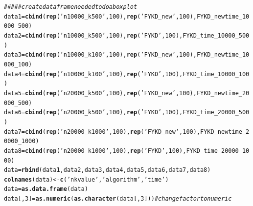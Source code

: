 \documentclass{article}\usepackage[]{graphicx}\usepackage[]{color}
\makeatletter
\newcommand{\hlnum}[1]{\textcolor[rgb]{0.686,0.059,0.569}{#1}}%
\newcommand{\hlstr}[1]{\textcolor[rgb]{0.192,0.494,0.8}{#1}}%
\newcommand{\hlcom}[1]{\textcolor[rgb]{0.678,0.584,0.686}{\textit{#1}}}%
\newcommand{\hlstd}[1]{\textcolor[rgb]{0.345,0.345,0.345}{#1}}%
\newcommand{\hlkwb}[1]{\textcolor[rgb]{0.69,0.353,0.396}{#1}}%
\newcommand{\hlkwd}[1]{\textcolor[rgb]{0.737,0.353,0.396}{\textbf{#1}}}%
\newenvironment{kframe}{%
 \def\at@end@of@kframe{}%
 \ifinner\ifhmode%
  \def\at@end@of@kframe{\end{minipage}}%
  \begin{minipage}{\columnwidth}%
 \fi\fi%
 \def\FrameCommand##1{\hskip\@totalleftmargin \hskip-\fboxsep
 \colorbox{shadecolor}{##1}\hskip-\fboxsep
     \hskip-\linewidth \hskip-\@totalleftmargin \hskip\columnwidth}%
 \MakeFramed {\advance\hsize-\width
   \@totalleftmargin\z@ \linewidth\hsize
   \@setminipage}}%
 {\par\unskip\endMakeFramed%
 \at@end@of@kframe}
\newenvironment{knitrout}{}{} %
\makeatother
\begin{document}
\begin{knitrout}
\color{fgcolor}\begin{kframe}
\begin{alltt}
\hlcom{#####create dataframe needed to do a boxplot }
\hlstd{data1}\hlkwb{=}\hlkwd{cbind}\hlstd{(}\hlkwd{rep}\hlstd{(}\hlstr{'n10000_k500'}\hlstd{,}\hlnum{100}\hlstd{),}\hlkwd{rep}\hlstd{(}\hlstr{'FYKD_new'}\hlstd{,}\hlnum{100}\hlstd{),FYKD_newtime_10000_500)}
\hlstd{data2}\hlkwb{=}\hlkwd{cbind}\hlstd{(}\hlkwd{rep}\hlstd{(}\hlstr{'n10000_k500'}\hlstd{,}\hlnum{100}\hlstd{),}\hlkwd{rep}\hlstd{(}\hlstr{'FYKD'}\hlstd{,}\hlnum{100}\hlstd{),FYKD_time_10000_500)}
\hlstd{data3}\hlkwb{=}\hlkwd{cbind}\hlstd{(}\hlkwd{rep}\hlstd{(}\hlstr{'n10000_k100'}\hlstd{,}\hlnum{100}\hlstd{),}\hlkwd{rep}\hlstd{(}\hlstr{'FYKD_new'}\hlstd{,}\hlnum{100}\hlstd{),FYKD_newtime_10000_100)}
\hlstd{data4}\hlkwb{=}\hlkwd{cbind}\hlstd{(}\hlkwd{rep}\hlstd{(}\hlstr{'n10000_k100'}\hlstd{,}\hlnum{100}\hlstd{),}\hlkwd{rep}\hlstd{(}\hlstr{'FYKD'}\hlstd{,}\hlnum{100}\hlstd{),FYKD_time_10000_100)}
\hlstd{data5}\hlkwb{=}\hlkwd{cbind}\hlstd{(}\hlkwd{rep}\hlstd{(}\hlstr{'n20000_k500'}\hlstd{,}\hlnum{100}\hlstd{),}\hlkwd{rep}\hlstd{(}\hlstr{'FYKD_new'}\hlstd{,}\hlnum{100}\hlstd{),FYKD_newtime_20000_500)}
\hlstd{data6}\hlkwb{=}\hlkwd{cbind}\hlstd{(}\hlkwd{rep}\hlstd{(}\hlstr{'n20000_k500'}\hlstd{,}\hlnum{100}\hlstd{),}\hlkwd{rep}\hlstd{(}\hlstr{'FYKD'}\hlstd{,}\hlnum{100}\hlstd{),FYKD_time_20000_500)}
\hlstd{data7}\hlkwb{=}\hlkwd{cbind}\hlstd{(}\hlkwd{rep}\hlstd{(}\hlstr{'n20000_k1000'}\hlstd{,}\hlnum{100}\hlstd{),}\hlkwd{rep}\hlstd{(}\hlstr{'FYKD_new'}\hlstd{,}\hlnum{100}\hlstd{),FYKD_newtime_20000_1000)}
\hlstd{data8}\hlkwb{=}\hlkwd{cbind}\hlstd{(}\hlkwd{rep}\hlstd{(}\hlstr{'n20000_k1000'}\hlstd{,}\hlnum{100}\hlstd{),}\hlkwd{rep}\hlstd{(}\hlstr{'FYKD'}\hlstd{,}\hlnum{100}\hlstd{),FYKD_time_20000_1000)}
\hlstd{data}\hlkwb{=}\hlkwd{rbind}\hlstd{(data1,data2,data3,data4,data5,data6,data7,data8)}
\hlkwd{colnames}\hlstd{(data)}\hlkwb{<-}\hlkwd{c}\hlstd{(}\hlstr{'nkvalue'}\hlstd{,}\hlstr{'algorithm'}\hlstd{,}\hlstr{'time'}\hlstd{)}
\hlstd{data}\hlkwb{=}\hlkwd{as.data.frame}\hlstd{(data)}
\hlstd{data[,}\hlnum{3}\hlstd{]}\hlkwb{=}\hlkwd{as.numeric}\hlstd{(}\hlkwd{as.character}\hlstd{(data[,}\hlnum{3}\hlstd{]))} \hlcom{#change factor to numeric}
\end{alltt}
\end{kframe}
\end{knitrout}
\end{document}
